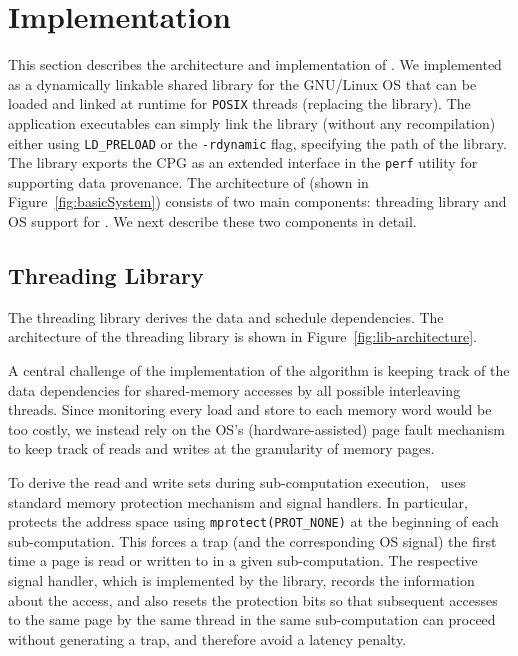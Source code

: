 \section{Implementation}
\label{sec:implementation}



This section describes the architecture and implementation of \projecttitle. We implemented \projecttitle as a dynamically linkable shared library for the GNU/Linux OS that can be loaded and linked  at runtime for {\tt POSIX} threads (replacing the \pthreads library). The application executables can simply link the library (without any recompilation) either using {\tt LD\_PRELOAD} or the {\tt -rdynamic} flag, specifying the path of the \projecttitle library.  The \projecttitle library exports the CPG as an extended interface in the {\tt perf} utility for supporting data provenance.   The architecture of \projecttitle (shown in Figure~\ref{fig:basicSystem}) consists of two main components: threading library and OS support for \intelpt. We next describe these two components in detail.




\subsection{Threading Library}
The threading library derives the data and schedule dependencies. The architecture of the threading library is shown in Figure~\ref{fig:lib-architecture}. 

 
 A central challenge of the implementation of the algorithm is keeping track of the data dependencies for shared-memory accesses by all possible interleaving threads. Since monitoring every load and store to each memory word would be too costly, we instead rely on the OS's (hardware-assisted) page fault mechanism to keep track of reads and writes at the granularity of memory pages.

To derive the read and write sets during sub-computation execution,  \projecttitle~uses standard memory protection  mechanism and signal handlers. In particular, \projecttitle protects the address space using {\tt mprotect(PROT\_NONE)} at the beginning of each sub-computation. This forces a trap (and the corresponding OS signal) the first time a page is read or written to in a given sub-computation. The respective signal handler, which is implemented by the \projecttitle library, records the information about the access, and also resets the protection bits so that subsequent accesses to the same page by the same thread in the same sub-computation can proceed without generating a trap, and therefore avoid a
latency penalty.  

